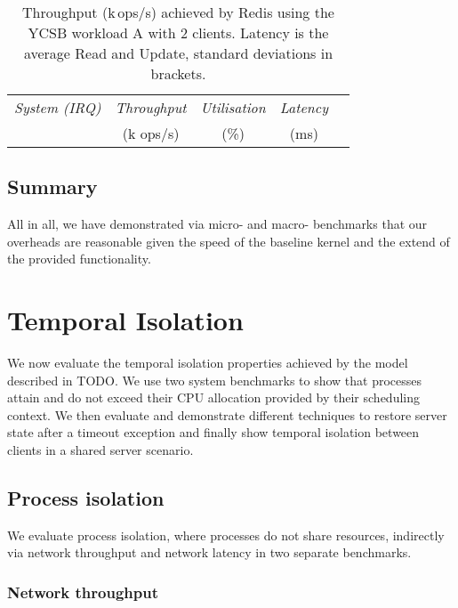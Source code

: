 \begin{table}[t]\centering
      \begin{tabular}{lcccc}\toprule
        \emph{System (IRQ)}  & \emph{Throughput} & \emph{Utilisation} &  \emph{Latency} \\
                               & (k ops/s)     &  (\%)            &   (ms)            \\
        \midrule
      
      \bottomrule
    \end{tabular}
    \caption{Throughput (k\,ops/s) achieved by Redis using the YCSB
      workload A with 2 clients.  Latency is the average Read and Update,
      standard deviations in brackets.}
    \label{t:redis}
\end{table}

\subsection{Summary}

All in all, we have demonstrated via micro- and macro- benchmarks that our overheads are
reasonable given the speed of the baseline kernel and the extend of the provided
functionality. 
\clearpage

\section{Temporal Isolation}

We now evaluate the temporal isolation properties achieved by the model described in TODO. We use
two system benchmarks to show that processes attain and do not exceed their
CPU allocation provided by their scheduling context. We then evaluate and demonstrate different
techniques to restore server state after a timeout exception and finally show temporal isolation between
clients in a shared server scenario.

\subsection{Process isolation} 

We evaluate process isolation, where processes do not share resources, indirectly via network
throughput and network latency in two separate benchmarks. 

\subsubsection{Network throughput}

